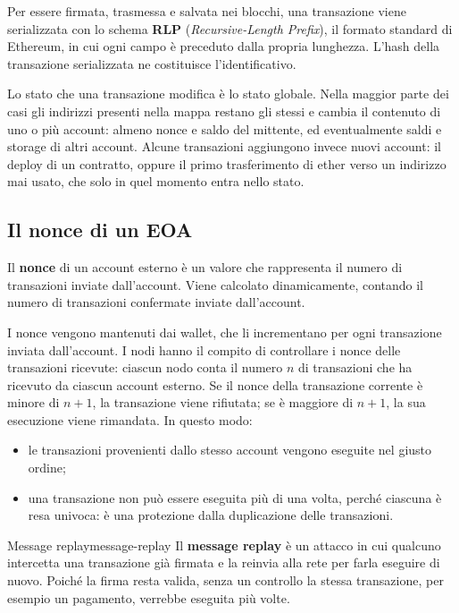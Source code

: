 \documentclass[a4paper, 11pt, oneside]{book}
\begin{document}
	Per essere firmata, trasmessa e salvata nei blocchi, una transazione viene
	serializzata con lo schema \textbf{RLP} (\textit{Recursive-Length Prefix}), il
	formato standard di Ethereum, in cui ogni campo è preceduto dalla propria
	lunghezza. L'hash della transazione serializzata ne costituisce l'identificativo.

	Lo stato che una transazione modifica è lo stato globale. Nella maggior parte dei
	casi gli indirizzi presenti nella mappa restano gli stessi e cambia il contenuto di
	uno o più account: almeno nonce e saldo del mittente, ed eventualmente saldi e
	storage di altri account. Alcune transazioni aggiungono invece nuovi account: il
	deploy di un contratto, oppure il primo trasferimento di ether verso un indirizzo
	mai usato, che solo in quel momento entra nello stato.

	\subsection{Il nonce di un EOA}
	Il \textbf{nonce} di un account esterno è un valore che rappresenta il numero di
	transazioni inviate dall'account. Viene calcolato dinamicamente, contando il numero
	di transazioni confermate inviate dall'account.

	I nonce vengono mantenuti dai wallet, che li incrementano per ogni transazione
	inviata dall'account. I nodi hanno il compito di controllare i nonce delle
	transazioni ricevute: ciascun nodo conta il numero $n$ di transazioni che ha
	ricevuto da ciascun account esterno. Se il nonce della transazione corrente è minore
	di $n+1$, la transazione viene rifiutata; se è maggiore di $n+1$, la sua esecuzione
	viene rimandata. In questo modo:
	\begin{itemize}
		\item le transazioni provenienti dallo stesso account vengono eseguite nel giusto
			ordine;
		\item una transazione non può essere eseguita più di una volta, perché ciascuna è
			resa univoca: è una protezione dalla duplicazione delle transazioni.
	\end{itemize}

	\begin{definizione}{Message replay}{message-replay}
		Il \textbf{message replay} è un attacco in cui qualcuno intercetta una
		transazione già firmata e la reinvia alla rete per farla eseguire di nuovo. Poiché
		la firma resta valida, senza un controllo la stessa transazione, per esempio un
		pagamento, verrebbe eseguita più volte.
	\end{definizione}
\end{document}
